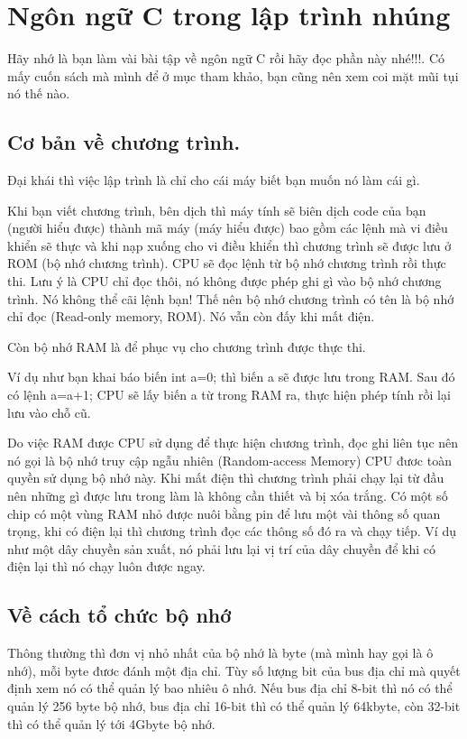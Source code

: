 \chapter{Ngôn ngữ C trong lập trình nhúng}

Hãy nhớ là bạn làm vài bài tập về ngôn ngữ C rồi hãy đọc phần này nhé!!!. Có mấy cuốn sách mà mình để ở mục tham khảo, bạn cũng nên xem coi mặt mũi tụi nó thế nào.

\newpage
\section{Cơ bản về chương trình.}
 
Đại khái thì việc lập trình là chỉ cho cái máy biết bạn muốn nó làm cái gì.

Khi bạn viết chương trình, bên dịch thì máy tính sẽ biên dịch code của bạn (người hiểu được) thành mã máy (máy hiểu được) bao gồm các lệnh mà vi điều khiển sẽ thực và khi nạp xuống cho vi điều khiển thì chương trình sẽ được lưu ở ROM (bộ nhớ chương trình). CPU sẽ đọc lệnh từ bộ nhớ chương trình rồi thực thi. Lưu ý là CPU chỉ đọc thôi, nó không được phép ghi gì vào bộ nhớ chương trình. Nó không thể cãi lệnh bạn! Thế nên bộ nhớ chương trình có tên là bộ nhớ chỉ đọc (Read-only memory, ROM). Nó vẫn còn đấy khi mất điện.

Còn bộ nhớ RAM là để phục vụ cho chương trình được thực thi.

Ví dụ như bạn khai báo biến int a=0; thì biến a sẽ được lưu trong RAM. Sau đó có lệnh a=a+1; CPU sẽ lấy biến a từ trong RAM ra, thực hiện phép tính rồi lại lưu vào chỗ cũ.

Do việc RAM được CPU sử dụng để thực hiện chương trình, đọc ghi liên tục nên nó gọi là bộ nhớ truy cập ngẫu nhiên (Random-access Memory) CPU đươc toàn quyền sử dụng bộ nhớ này. Khi mất điện thì chương trình phải chạy lại từ đầu nên những gì được lưu trong làm là không cần thiết và bị xóa trắng. Có một số chip có một vùng RAM nhỏ được nuôi bằng pin để lưu một vài thông số quan trọng, khi có điện lại thì chương trình đọc các thông số đó ra và chạy tiếp. Ví dụ như một dây chuyền sản xuất, nó phải lưu lại vị trí của dây chuyền để khi có điện lại thì nó chạy luôn được ngay.

\section{Về cách tổ chức bộ nhớ}

Thông thường thì đơn vị nhỏ nhất của bộ nhớ là byte (mà mình hay gọi là ô nhớ), mỗi byte đươc đánh một địa chỉ. Tùy số lượng bit của bus địa chỉ mà quyết định xem nó có thể quản lý bao nhiêu ô nhớ. Nếu bus địa chỉ 8-bit thì nó có thể quản lý 256 byte bộ nhớ, bus địa chỉ 16-bit thì có thể quản lý 64kbyte, còn 32-bit thì có thể quản lý tới 4Gbyte bộ nhớ. 

